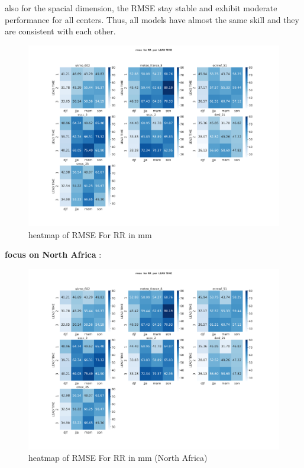also for the spacial dimension, the RMSE stay stable and exhibit moderate performance for all centers. Thus, all models have almost the same skill and they are consistent with each other.

\begin{figure}[H]
\centering
\includegraphics[scale=0.3]{plots/det/rmse/rmse_RR.png}
\caption{heatmap of RMSE For RR in mm}
\end{figure}

\vspace{1.5cm}

\textbf{focus on North Africa} : 
\begin{figure}[H]
\centering
\includegraphics[scale=0.3]{plots/det/rmse/rmse_RR.png}
\caption{heatmap of RMSE For RR in mm (North Africa)}
\end{figure}

